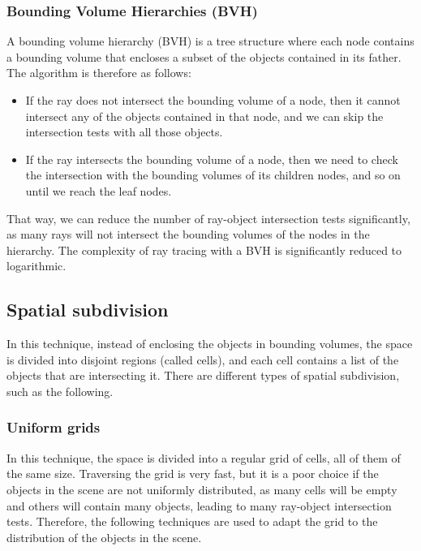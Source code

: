 \subsubsection{Bounding Volume Hierarchies (BVH)}

A bounding volume hierarchy (BVH) is a tree structure where each node contains a bounding volume that encloses a subset of the objects contained in its father. The algorithm is therefore as follows:
\begin{itemize}
    \item If the ray does not intersect the bounding volume of a node, then it cannot intersect any of the objects contained in that node, and we can skip the intersection tests with all those objects.
    \item If the ray intersects the bounding volume of a node, then we need to check the intersection with the bounding volumes of its children nodes, and so on until we reach the leaf nodes.
\end{itemize}

That way, we can reduce the number of ray-object intersection tests significantly, as many rays will not intersect the bounding volumes of the nodes in the hierarchy. The complexity of ray tracing with a BVH is significantly reduced to logarithmic.

\subsection{Spatial subdivision}\label{sec:spatial-subdivision}

In this technique, instead of enclosing the objects in bounding volumes, the space is divided into disjoint regions (called cells), and each cell contains a list of the objects that are intersecting it. There are different types of spatial subdivision, such as the following.

\subsubsection{Uniform grids}

In this technique, the space is divided into a regular grid of cells, all of them of the same size. Traversing the grid is very fast, but it is a poor choice if the objects in the scene are not uniformly distributed, as many cells will be empty and others will contain many objects, leading to many ray-object intersection tests. Therefore, the following techniques are used to adapt the grid to the distribution of the objects in the scene.

